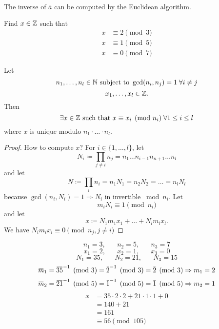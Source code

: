 \documentclass[NumTh.tex]{subfiles}
\begin{document}
\begin{rem}
The inverse of $\overbar{a}$ can be computed by the Euclidean algorithm.
\end{rem}

\begin{ex}
Find $x \in \mathbb{Z}$ such that 
\begin{align}
x &\equiv 2 \pmod{3}\\
x &\equiv 1 \pmod{5}\\
x &\equiv 0 \pmod{7}
\end{align}
\end{ex}

\begin{theorem}\label{th_0_3_4}
  Let
  \[ n_1,\dots,n_l \in \mathbb{N} \text{ subject to } \gcd (n_i,n_j) = 1 \;\forall i\neq j \]
  \[ x_1, \dots, x_l \in \mathbb{Z} \text{.} \]
  Then
  \[ \exists x \in \mathbb{Z} \text{ such that } x \equiv x_i \pmod{n_i} \; \forall 1\leq i \leq l \]
  where $x$ is unique modulo $n_1 \cdot \dots \cdot n_l$.
\end{theorem}

\begin{proof}
How to compute $x$? For $i \in \{1,\dots,l\}$, let
\[ N_i \coloneq \prod_{j \neq i} n_j = n_1 \dots n_{i-1} n_{n+1} \dots n_l \]
and let
\[ N \coloneq \prod_i n_i = n_1 N_1 = n_2 N_2 = \dots = n_l N_l \]
because $\gcd(n_i,N_i) = 1 \Rightarrow N_i$ in invertible $\bmod n_i$. Let
\[ m_i N_i \equiv 1 \pmod{n_i} \]
and let
\[ x \coloneq N_1 m_1 x_1 + \dots + N_l m_l x_l \text{.} \]
We have $N_i m_i x_i \equiv 0 \pmod{n_j, j\neq i}$%
\end{proof}

\begin{ex}
  \[
    n_1 = 3, \hspace{20pt} n_2 = 5, \hspace{20pt} n_3 = 7
  \] \[
    x_1 = 2, \hspace{20pt} x_2 = 1, \hspace{20pt} x_3 = 0
  \] \[
    N_1 = 35, \hspace{20pt} N_2 = 21, \hspace{20pt} N_3 = 15
  \]
  \[ \overbar{m}_1 = \inv{\overbar{35}} \pmod{3} = \inv{\overbar{2}} \pmod{3} = \overbar{2} \pmod{3} \Rightarrow m_1 = 2 \]
  \[ \overbar{m}_2 = \inv{\overbar{21}} \pmod{5} = \inv{\overbar{1}} \pmod{5} = \overbar{1} \pmod{5} \Rightarrow m_2 = 1 \]
  \begin{align*}
    x &= 35 \cdot 2 \cdot 2 + 21 \cdot 1 \cdot 1 + 0 \\
      &= 140 + 21 \\
      &= 161 \\
      &\equiv 56 \pmod{105}
  \end{align*}
\end{ex}
\end{document}
